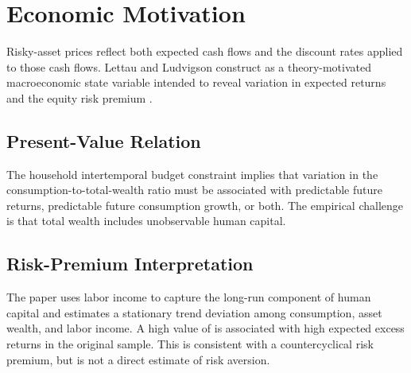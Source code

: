 \section{Economic Motivation}

Risky-asset prices reflect both expected cash flows and the discount rates
applied to those cash flows. Lettau and Ludvigson construct \cay{} as a
theory-motivated macroeconomic state variable intended to reveal variation
in expected returns and the equity risk premium \citep{lettau_ludvigson_2001}.

\subsection{Present-Value Relation}

The household intertemporal budget constraint implies that variation in the
consumption-to-total-wealth ratio must be associated with predictable future
returns, predictable future consumption growth, or both. The empirical
challenge is that total wealth includes unobservable human capital.

\subsection{Risk-Premium Interpretation}

The paper uses labor income to capture the long-run component of human
capital and estimates a stationary trend deviation among consumption, asset
wealth, and labor income. A high value of \cay{} is associated with high
expected excess returns in the original sample. This is consistent with a
countercyclical risk premium, but \cay{} is not a direct estimate of risk
aversion.
